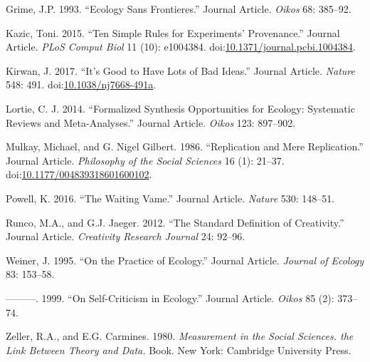 \documentclass[]{elsarticle} %
\begin{document}
\hypertarget{ref-Grime1993}{}
Grime, J.P. 1993. ``Ecology Sans Frontieres.'' Journal Article.
\emph{Oikos} 68: 385--92.

\hypertarget{ref-Kazic2015}{}
Kazic, Toni. 2015. ``Ten Simple Rules for Experiments' Provenance.''
Journal Article. \emph{PLoS Comput Biol} 11 (10): e1004384.
doi:\href{https://doi.org/10.1371/journal.pcbi.1004384}{10.1371/journal.pcbi.1004384}.

\hypertarget{ref-Kirwan2017}{}
Kirwan, J. 2017. ``It's Good to Have Lots of Bad Ideas.'' Journal
Article. \emph{Nature} 548: 491.
doi:\href{https://doi.org/10.1038/nj7668-491a}{10.1038/nj7668-491a}.

\hypertarget{ref-Lortie2014}{}
Lortie, C. J. 2014. ``Formalized Synthesis Opportunities for Ecology:
Systematic Reviews and Meta-Analyses.'' Journal Article. \emph{Oikos}
123: 897--902.

\hypertarget{ref-Mulkay1986}{}
Mulkay, Michael, and G. Nigel Gilbert. 1986. ``Replication and Mere
Replication.'' Journal Article. \emph{Philosophy of the Social Sciences}
16 (1): 21--37.
doi:\href{https://doi.org/10.1177/004839318601600102}{10.1177/004839318601600102}.

\hypertarget{ref-Powell2016}{}
Powell, K. 2016. ``The Waiting Vame.'' Journal Article. \emph{Nature}
530: 148--51.

\hypertarget{ref-Runco2012}{}
Runco, M.A., and G.J. Jaeger. 2012. ``The Standard Definition of
Creativity.'' Journal Article. \emph{Creativity Research Journal} 24:
92--96.

\hypertarget{ref-Weiner1995}{}
Weiner, J. 1995. ``On the Practice of Ecology.'' Journal Article.
\emph{Journal of Ecology} 83: 153--58.

\hypertarget{ref-Weiner1999}{}
---------. 1999. ``On Self-Criticism in Ecology.'' Journal Article.
\emph{Oikos} 85 (2): 373--74.

\hypertarget{ref-Zeller1980}{}
Zeller, R.A., and E.G. Carmines. 1980. \emph{Measurement in the Social
Sciences. the Link Between Theory and Data.} Book. New York: Cambridge
University Press.
\end{document}
